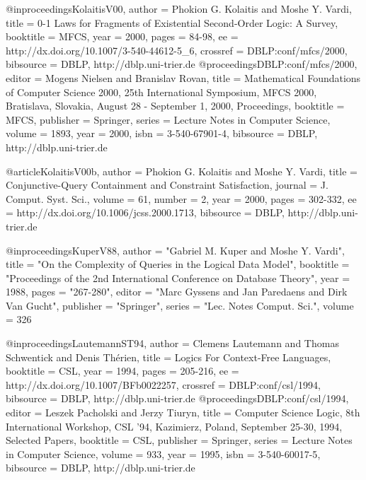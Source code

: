 \documentclass{article}
\begin{document}
@inproceedings{KolaitisV00,
  author    = {Phokion G. Kolaitis and
               Moshe Y. Vardi},
  title     = {0-1 Laws for Fragments of Existential Second-Order Logic:
               A Survey},
  booktitle = {MFCS},
  year      = {2000},
  pages     = {84-98},
  ee        = {http://dx.doi.org/10.1007/3-540-44612-5_6},
  crossref  = {DBLP:conf/mfcs/2000},
  bibsource = {DBLP, http://dblp.uni-trier.de}
}
@proceedings{DBLP:conf/mfcs/2000,
  editor    = {Mogens Nielsen and
               Branislav Rovan},
  title     = {Mathematical Foundations of Computer Science 2000, 25th
               International Symposium, MFCS 2000, Bratislava, Slovakia,
               August 28 - September 1, 2000, Proceedings},
  booktitle = {MFCS},
  publisher = {Springer},
  series    = {Lecture Notes in Computer Science},
  volume    = {1893},
  year      = {2000},
  isbn      = {3-540-67901-4},
  bibsource = {DBLP, http://dblp.uni-trier.de}
}

@article{KolaitisV00b,
  author    = {Phokion G. Kolaitis and
               Moshe Y. Vardi},
  title     = {Conjunctive-Query Containment and Constraint Satisfaction},
  journal   = {J. Comput. Syst. Sci.},
  volume    = {61},
  number    = {2},
  year      = {2000},
  pages     = {302-332},
  ee        = {http://dx.doi.org/10.1006/jcss.2000.1713},
  bibsource = {DBLP, http://dblp.uni-trier.de}
}

@inproceedings{KuperV88,
  author    = "Gabriel M. Kuper and Moshe Y. Vardi",
  title     = "On the Complexity of Queries in the Logical Data Model",
  booktitle = "Proceedings of the 2nd International Conference on Database Theory",
  year      = 1988,
  pages     = "267-280",
  editor    = "Marc Gyssens and Jan Paredaens and Dirk Van Gucht",
  publisher = "Springer",
  series    = "Lec. Notes Comput. Sci.",
  volume    = 326
}

@inproceedings{LautemannST94,
  author    = {Clemens Lautemann and
               Thomas Schwentick and
               Denis Th{\'e}rien},
  title     = {Logics For Context-Free Languages},
  booktitle = {CSL},
  year      = {1994},
  pages     = {205-216},
  ee        = {http://dx.doi.org/10.1007/BFb0022257},
  crossref  = {DBLP:conf/csl/1994},
  bibsource = {DBLP, http://dblp.uni-trier.de}
}
@proceedings{DBLP:conf/csl/1994,
  editor    = {Leszek Pacholski and
               Jerzy Tiuryn},
  title     = {Computer Science Logic, 8th International Workshop, CSL
               '94, Kazimierz, Poland, September 25-30, 1994, Selected
               Papers},
  booktitle = {CSL},
  publisher = {Springer},
  series    = {Lecture Notes in Computer Science},
  volume    = {933},
  year      = {1995},
  isbn      = {3-540-60017-5},
  bibsource = {DBLP, http://dblp.uni-trier.de}
}
\end{document}
